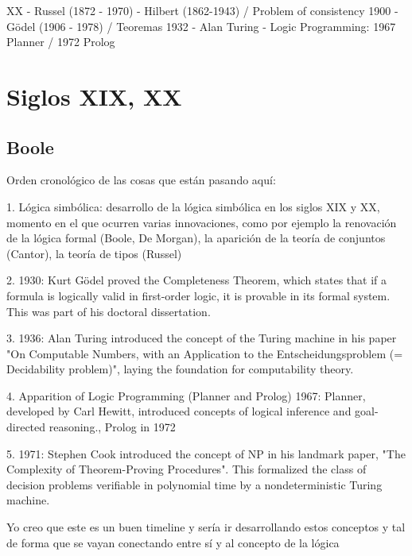 \documentclass{article}
\begin{document}
XX
- Russel (1872 - 1970)
- Hilbert (1862-1943) / Problem of consistency 1900
- Gödel (1906 - 1978) / Teoremas 1932
- Alan Turing
- Logic Programming: 1967 Planner / 1972 Prolog

\section{Siglos XIX, XX}

\subsection{Boole}

Orden cronológico de las cosas que están pasando aquí:

1. Lógica simbólica: desarrollo de la
lógica simbólica en los siglos XIX y XX, momento en el que ocurren varias
innovaciones, como por ejemplo la renovación de la lógica formal (Boole, De
Morgan), la aparición de la teoría de conjuntos (Cantor), la teoría de tipos
(Russel)

2. 1930: Kurt Gödel proved the Completeness Theorem, which states that if a formula is logically valid in first-order logic, it is provable in its formal system. This was part of his doctoral dissertation.

3. 1936: Alan Turing introduced the concept of the Turing machine in his paper "On Computable Numbers, with an Application to the Entscheidungsproblem (= Decidability problem)", laying the foundation for computability theory.

4. Apparition of Logic Programming (Planner and Prolog) 
1967: Planner, developed by Carl Hewitt, introduced concepts of logical inference and goal-directed reasoning., Prolog in 1972

5. 1971: Stephen Cook introduced the concept of NP in his landmark paper, "The Complexity of Theorem-Proving Procedures". This formalized the class of decision problems verifiable in polynomial time by a nondeterministic Turing machine.

Yo creo que este es un buen timeline y sería ir desarrollando estos conceptos y tal de forma que se vayan conectando entre sí y al concepto de la lógica




\renewcommand{\refname}{Referencias}


\end{document}
